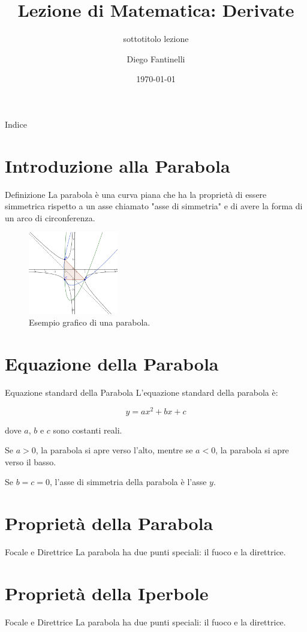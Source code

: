 \documentclass[aspectratio=169]{beamer}
\title[Titolo in basso a destra]{Lezione di Matematica: Derivate}
\subtitle{sottotitolo lezione}
\date{\today}
\author{Diego Fantinelli}
\institute{Matematica per il Liceo}
\begin{document}
\begin{frame}
  \maketitle
\end{frame}

\begin{frame}{Indice}
  \tableofcontents
\end{frame}

\section{Introduzione alla Parabola}

\begin{frame}{Definizione}
La parabola è una curva piana che ha la proprietà di essere simmetrica rispetto a un asse chiamato "asse di simmetria" e di avere la forma di un arco di circonferenza.
  
 \begin{figure}[htbp]
  \centering
    \includegraphics[width=0.35\textwidth]{parabola.png}
      \caption{Esempio grafico di una parabola.}
      \label{fig:parabola}
 \end{figure}  
\end{frame}

\section{Equazione della Parabola}

\begin{frame}{Equazione standard della Parabola}
  L'equazione standard della parabola è:
  
  $$y = ax^2 + bx + c$$
  
  dove $a$, $b$ e $c$ sono costanti reali.
  
  Se $a > 0$, la parabola si apre verso l'alto, mentre se $a < 0$, la parabola si apre verso il basso.
  
  Se $b = c = 0$, l'asse di simmetria della parabola è l'asse $y$.
\end{frame}

\section{Proprietà della Parabola}

\begin{frame}{Focale e Direttrice}
  La parabola ha due punti speciali: il fuoco e la direttrice.
\end{frame}

\section{Proprietà della Iperbole}

\begin{frame}{Focale e Direttrice}
  La parabola ha due punti speciali: il fuoco e la direttrice.
\end{frame}
\end{document}
